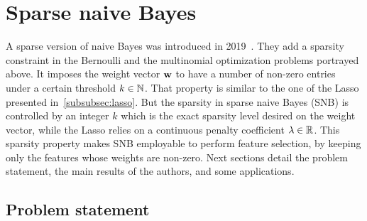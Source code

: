 \section{Sparse naive Bayes}\label{sec:snb}

A sparse version of naive Bayes was introduced in 2019~\cite{sparse_naive_bayes}.
They add a sparsity constraint in the Bernoulli and the multinomial optimization problems portrayed above.
It imposes the weight vector $\mathbf{w}$ to have a number of non-zero entries under a certain threshold $k \in \mathbb{N}$.
That property is similar to the one of the Lasso presented in~\ref{subsubsec:lasso}.
But the sparsity in sparse naive Bayes (SNB) is controlled by an integer $k$ which is
the exact sparsity level desired on the weight vector,
while the Lasso relies on a continuous penalty coefficient $\lambda \in \mathbb{R}$.
This sparsity property makes SNB employable to perform feature selection,
by keeping only the features whose weights are non-zero.
Next sections detail the problem statement, the main results of the authors,
and some applications.

\subsection{Problem statement}\label{subsec:snb_ps}

